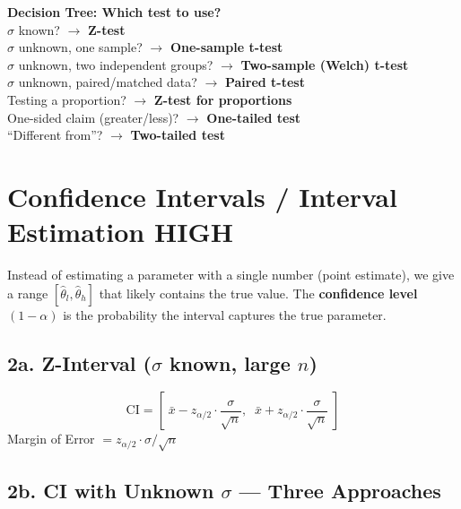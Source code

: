 \documentclass[11pt, letterpaper]{article}
\begin{document}
\begin{tipbox}
\textbf{Decision Tree: Which test to use?}\\[4pt]
$\sigma$ known? $\rightarrow$ \textbf{Z-test} \\
$\sigma$ unknown, one sample? $\rightarrow$ \textbf{One-sample t-test} \\
$\sigma$ unknown, two independent groups? $\rightarrow$ \textbf{Two-sample (Welch) t-test} \\
$\sigma$ unknown, paired/matched data? $\rightarrow$ \textbf{Paired t-test} \\
Testing a proportion? $\rightarrow$ \textbf{Z-test for proportions} \\
One-sided claim (greater/less)? $\rightarrow$ \textbf{One-tailed test} \\
``Different from''? $\rightarrow$ \textbf{Two-tailed test}
\end{tipbox}

\newpage
\hypertarget{sec:ci}{}
\section{Confidence Intervals / Interval Estimation \hfill \textcolor{warningred}{\small HIGH}}

Instead of estimating a parameter with a single number (point estimate), we give a range $[\hat{\theta}_l, \hat{\theta}_h]$ that likely contains the true value. The \textbf{confidence level} $(1-\alpha)$ is the probability the interval captures the true parameter.

\subsection{2a. Z-Interval ($\sigma$ known, large $n$)}

\begin{formulabox}
\[ \text{CI} = \left[\; \bar{x} - z_{\alpha/2} \cdot \frac{\sigma}{\sqrt{n}},\;\; \bar{x} + z_{\alpha/2} \cdot \frac{\sigma}{\sqrt{n}} \;\right] \]
Margin of Error $= z_{\alpha/2} \cdot \sigma/\sqrt{n}$
\end{formulabox}

\subsection{2b. CI with Unknown $\sigma$ --- Three Approaches}
\end{document}
